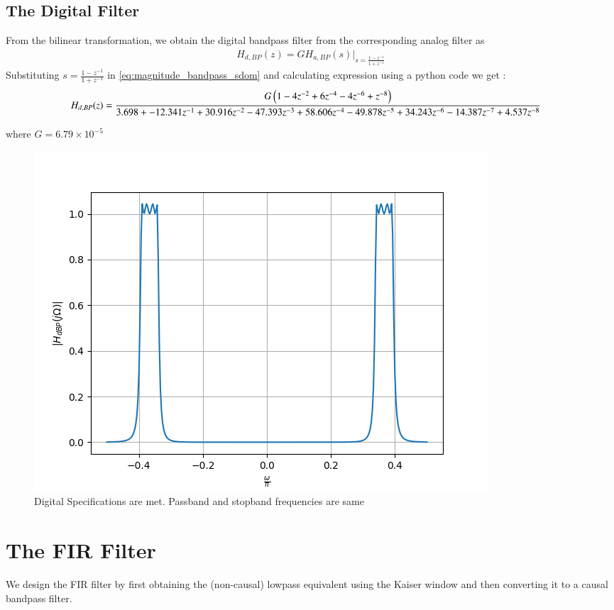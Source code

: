 \documentclass{article}
\begin{document}
\subsection{The Digital Filter}
From the bilinear transformation, we obtain the digital bandpass filter from the corresponding analog filter as
\begin{align}
    H_{d,BP}(z) = GH_{a,BP}(s)\vert_{s = \frac{1-z^{-1}}{1 + z^{-1}}}
\end{align}
Substituting $s=\frac{1-z^{-1}}{1+z^{-1}}$ in \eqref{eq:magnitude_bandpass_sdom} and calculating expression using a python code we get :
\begin{align}
    H_{d,BP}(z) &= \frac{G\left(1 - 4z^{-2} + 6z^{-4} - 4z^{-6} + z^{-8}\right)}{3.698 + -12.341z^{-1} + 30.916z^{-2} - 47.393z^{-3} + 58.606z^{-4} - 49.878z^{-5} + 34.243z^{-6} - 14.387z^{-7} + 4.537z^{-8}}
\end{align}

where $G=6.79\times 10^{-5}$
\begin{figure}[ht]
\centering
\includegraphics[width=1\columnwidth]{figs/Digital_BP.png}
\caption{Digital Specifications are met. Passband and stopband frequencies are same}
\label{fig:Digital_BPF}
\end{figure}

\section{The FIR Filter}
We design the FIR filter by first obtaining the (non-causal) lowpass equivalent using the Kaiser window
and then
converting it to a causal bandpass filter.
\end{document}
